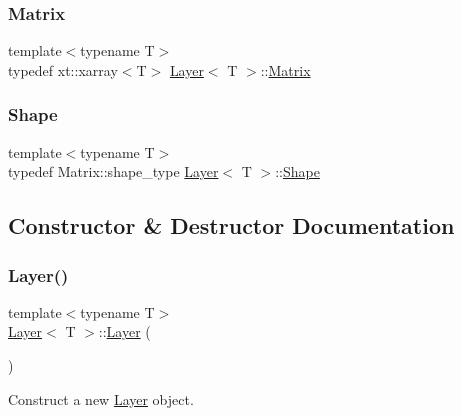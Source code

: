 \subsubsection{\texorpdfstring{Matrix}{Matrix}}
{\footnotesize\ttfamily template$<$typename T$>$ \\
typedef xt\+::xarray$<$T$>$ \mbox{\hyperlink{class_layer}{Layer}}$<$ T $>$\+::\mbox{\hyperlink{class_layer_a22b1e7286096aa62bd245536c8ebdaf1}{Matrix}}}

\mbox{\label{class_layer_a8313f42d2292d12dd5d40cc115636693}} 
\subsubsection{\texorpdfstring{Shape}{Shape}}
{\footnotesize\ttfamily template$<$typename T$>$ \\
typedef Matrix\+::shape\+\_\+type \mbox{\hyperlink{class_layer}{Layer}}$<$ T $>$\+::\mbox{\hyperlink{class_layer_a8313f42d2292d12dd5d40cc115636693}{Shape}}}



\subsection{Constructor \& Destructor Documentation}
\mbox{\label{class_layer_a7db1fc76bec3431efbb0984192e2ae23}} 
\subsubsection{\texorpdfstring{Layer()}{Layer()}}
{\footnotesize\ttfamily template$<$typename T$>$ \\
\mbox{\hyperlink{class_layer}{Layer}}$<$ T $>$\+::\mbox{\hyperlink{class_layer}{Layer}} (\begin{DoxyParamCaption}{ }\end{DoxyParamCaption})\hspace{0.3cm}{\ttfamily [default]}}



Construct a new \mbox{\hyperlink{class_layer}{Layer}} object. 

\mbox{\label{class_layer_ac2c7d2238eb3d09a2198736c5b10f940}} 
